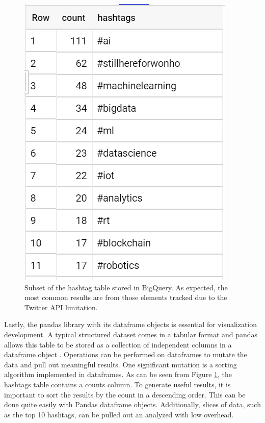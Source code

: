 \documentclass[conference]{IEEEtran}
\begin{document}
\begin{figure}
    \centering
    \includegraphics[scale=0.7]{img/bigquery_table.PNG}
    \caption{Subset of the hashtag table stored in BigQuery. As expected, the most common results are from those elements tracked due to the Twitter API limitation.}
    \label{fig:bigquery_table}
\end{figure}

Lastly, the pandas library with its dataframe objects is essential for visualization development. A typical structured dataset comes in a tabular format and pandas allows this table to be stored as a collection of independent columns in a dataframe object \cite{pandas_summary}. Operations can be performed on dataframes to mutate the data and pull out meaningful results. One significant mutation is a sorting algorithm implemented in dataframes. As can be seen from Figure \ref{fig:bigquery_table}, the hashtags table contains a counts column. To generate useful results, it is important to sort the results by the count in a descending order. This can be done quite easily with Pandas dataframe objects. Additionally, slices of data, such as the top 10 hashtags, can be pulled out an analyzed with low overhead. \par
\end{document}
